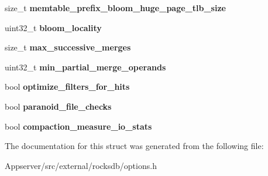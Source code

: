 \begin{DoxyCompactItemize}
\item 
size\+\_\+t {\bfseries memtable\+\_\+prefix\+\_\+bloom\+\_\+huge\+\_\+page\+\_\+tlb\+\_\+size}\hypertarget{structrocksdb_1_1ColumnFamilyOptions_a5a486f891b1a6e1c160423a4ca1cf614}{}\label{structrocksdb_1_1ColumnFamilyOptions_a5a486f891b1a6e1c160423a4ca1cf614}

\item 
uint32\+\_\+t {\bfseries bloom\+\_\+locality}\hypertarget{structrocksdb_1_1ColumnFamilyOptions_ade1810e42d9976ad7c3b04deaedecb8c}{}\label{structrocksdb_1_1ColumnFamilyOptions_ade1810e42d9976ad7c3b04deaedecb8c}

\item 
size\+\_\+t {\bfseries max\+\_\+successive\+\_\+merges}\hypertarget{structrocksdb_1_1ColumnFamilyOptions_a859ff3de043df6b3c56fb3864059af97}{}\label{structrocksdb_1_1ColumnFamilyOptions_a859ff3de043df6b3c56fb3864059af97}

\item 
uint32\+\_\+t {\bfseries min\+\_\+partial\+\_\+merge\+\_\+operands}\hypertarget{structrocksdb_1_1ColumnFamilyOptions_aa4ab70aa69ead877276ed0bdd3dcdd57}{}\label{structrocksdb_1_1ColumnFamilyOptions_aa4ab70aa69ead877276ed0bdd3dcdd57}

\item 
bool {\bfseries optimize\+\_\+filters\+\_\+for\+\_\+hits}\hypertarget{structrocksdb_1_1ColumnFamilyOptions_a76c648dd39b9abbb4f6cade7622feba2}{}\label{structrocksdb_1_1ColumnFamilyOptions_a76c648dd39b9abbb4f6cade7622feba2}

\item 
bool {\bfseries paranoid\+\_\+file\+\_\+checks}\hypertarget{structrocksdb_1_1ColumnFamilyOptions_a2467b8c33a910ab2a52a30040e3f1658}{}\label{structrocksdb_1_1ColumnFamilyOptions_a2467b8c33a910ab2a52a30040e3f1658}

\item 
bool {\bfseries compaction\+\_\+measure\+\_\+io\+\_\+stats}\hypertarget{structrocksdb_1_1ColumnFamilyOptions_a4464c82cabd9e13f26ca8551006988a5}{}\label{structrocksdb_1_1ColumnFamilyOptions_a4464c82cabd9e13f26ca8551006988a5}

\end{DoxyCompactItemize}


The documentation for this struct was generated from the following file\+:\begin{DoxyCompactItemize}
\item 
Appserver/src/external/rocksdb/options.\+h\end{DoxyCompactItemize}
